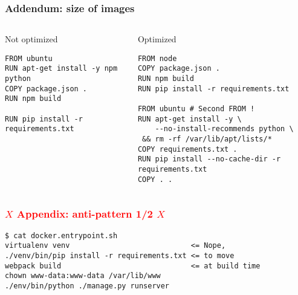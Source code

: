 \documentclass{beamer}
\begin{document}
\begin{frame}[fragile]
    \frametitle{Addendum: size of images}

    \begin{columns}
    \begin{column}{0.48\textwidth}
        \begin{alertblock}{Not optimized}
        \begin{verbatim}
FROM ubuntu
RUN apt-get install -y npm python
COPY package.json .
RUN npm build

RUN pip install -r requirements.txt
        \end{verbatim}
        \end{alertblock}
    \end{column}
    \begin{column}{0.49\textwidth}
        \begin{exampleblock}{Optimized}
        \begin{verbatim}
FROM node
COPY package.json .
RUN npm build
RUN pip install -r requirements.txt

FROM ubuntu # Second FROM !
RUN apt-get install -y \
    --no-install-recommends python \
 && rm -rf /var/lib/apt/lists/*
COPY requirements.txt .
RUN pip install --no-cache-dir -r requirements.txt
COPY . .
        \end{verbatim}
        \end{exampleblock}
    \end{column}
    \end{columns}
\end{frame}

\begin{frame}[fragile]
    \frametitle{\textcolor{red}{$X$ Appendix: anti-pattern 1/2 $X$}}

    \begin{verbatim}
$ cat docker.entrypoint.sh
virtualenv venv                            <= Nope,
./venv/bin/pip install -r requirements.txt <= to move
webpack build                              <= at build time
chown www-data:www-data /var/lib/www
./env/bin/python ./manage.py runserver
    \end{verbatim}

\end{frame}
\end{document}
